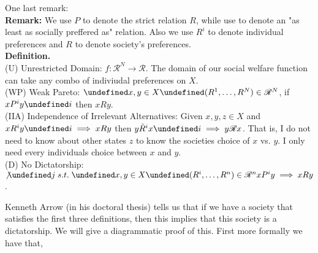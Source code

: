 \documentclass[dvips,11pt]{article}
\let\oldforall\forall
\let\forall\undefined
\DeclareMathOperator{\forall}{\,\oldforall\,}
\let\oldexists\exists
\let\exists\undefined
\DeclareMathOperator{\exists}{\,\oldexists\,}
\DeclareMathOperator{\?}{\,?\,}
\begin{document}
One last remark:
\\\textbf{Remark:} We use $P$ to denote the strict relation $R$, while use to denote an "as least as socially preffered as" relation. Also we use $R^i$ to denote individual preferences and $R$ to denote society's preferences.
\\\textbf{Definition.}
\\ (U) Unrestricted Domain: $f: \mathscr{R}^N \rightarrow \mathscr{R}$. The domain of our social welfare function can take any combo of indiviudal preferences on $X$.
\\ (WP) Weak Pareto: $\forall x,y \in X \forall (R^1,\dots,R^N)\in\mathscr{R}^N$, if $xP^iy \forall i$ then $xRy$.
\\ (IIA) Independence of Irrelevant Alternatives: Given $x,y,z \in X$ and $xR^iy \forall i \implies xRy$ then $y\tilde{R}^ix \forall i \implies y\mathscr{R}x$. That is, I do not need to know about other states $z$ to know the societies choice of $x$ vs. $y$. I only need every individuals choice between $x$ and $y$.
\\ (D) No Dictatorship: $\not\exists j \; s.t. \; \forall x,y \in X \forall (R^i, \dots, R^n) \in \mathscr{R}^n xP^iy \implies xRy$.

Kenneth Arrow (in his doctoral thesis) tells us that if we have a society that satisfies the first three definitions, then this implies that this society is a dictatorship. We will give a diagrammatic proof of this. First more formally we have that,
\end{document}
